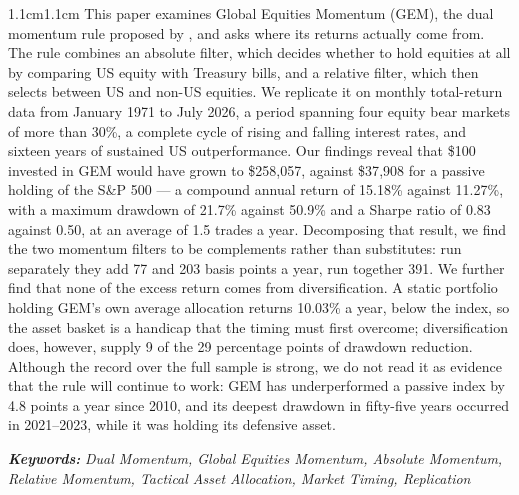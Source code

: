 \documentclass[11pt,a4paper]{article}
\begin{document}
\begin{adjustwidth}{1.1cm}{1.1cm}
\noindent
This paper examines Global Equities Momentum (GEM), the dual momentum rule
proposed by \citet{antonacci2016}, and asks where its returns actually come
from. The rule combines an absolute filter, which decides whether to hold
equities at all by comparing US equity with Treasury bills, and a relative
filter, which then selects between US and non-US equities. We replicate it on
monthly total-return data from January 1971 to July 2026, a period spanning
four equity bear markets of more than 30\%, a complete cycle of rising and
falling interest rates, and sixteen years of sustained US outperformance. Our
findings reveal that \$100 invested in GEM would have grown to \$258{,}057,
against \$37{,}908 for a passive holding of the S\&P 500 --- a compound annual
return of 15.18\% against 11.27\%, with a maximum drawdown of 21.7\% against
50.9\% and a Sharpe ratio of 0.83 against 0.50, at an average of 1.5 trades a
year. Decomposing that result, we find the two momentum filters to be
complements rather than substitutes: run separately they add 77 and 203 basis
points a year, run together 391. We further find that none of the excess return
comes from diversification. A static portfolio holding GEM's own average
allocation returns 10.03\% a year, below the index, so the asset basket is a
handicap that the timing must first overcome; diversification does, however,
supply 9 of the 29 percentage points of drawdown reduction. Although the record
over the full sample is strong, we do not read it as evidence that the rule
will continue to work: GEM has underperformed a passive index by 4.8 points a
year since 2010, and its deepest drawdown in fifty-five years occurred in
2021--2023, while it was holding its defensive asset.

\vspace{1.0em}
\noindent\footnotesize\textbf{\textit{Keywords:}} \textit{Dual Momentum, Global
Equities Momentum, Absolute Momentum, Relative Momentum, Tactical Asset
Allocation, Market Timing, Replication}
\end{adjustwidth}


\newpage
\setcounter{page}{2}
\end{document}
